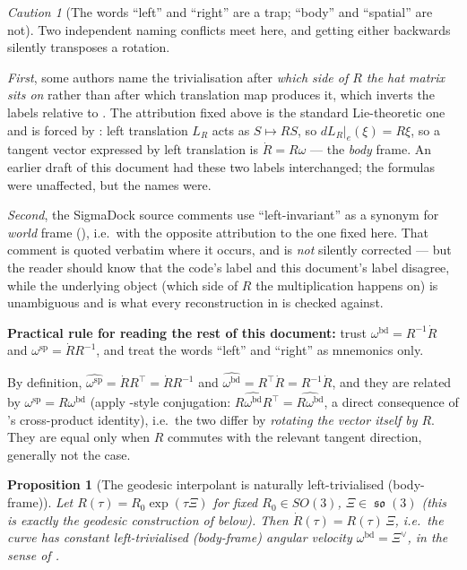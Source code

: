 \documentclass[11pt,a4paper]{report}
\newtheorem{proposition}[proposition]{Proposition}
\theoremstyle{definition}
\theoremstyle{remark}
\newtheorem{caution}[caution]{Caution}
\DeclareMathOperator{\so}{\mathfrak{so}}
\begin{document}
\begin{caution}[The words ``left'' and ``right'' are a trap; ``body'' and ``spatial'' are not]
\label{caution:trivialisation-terminology}
Two independent naming conflicts meet here, and getting either backwards
silently transposes a rotation.

\emph{First}, some authors name the trivialisation after \emph{which side of
$R$ the hat matrix sits on} rather than after which translation map produces
it, which inverts the labels relative to
. The attribution fixed above is the
standard Lie-theoretic one and is forced by
: left translation $L_R$ acts as $S\mapsto RS$, so
$dL_R|_e(\xi)=R\xi$, so a tangent vector expressed by left translation is
$\dot R = R\widehat\omega$ --- the \emph{body} frame. An earlier draft of this
document had these two labels interchanged; the formulas were unaffected, but
the names were.

\emph{Second}, the SigmaDock source comments use ``left-invariant'' as a
synonym for \emph{world} frame (), i.e.\ with the
opposite attribution to the one fixed here. That comment is quoted verbatim
where it occurs, and is \emph{not} silently corrected --- but the reader
should know that the code's label and this document's label disagree, while
the underlying object (which side of $R$ the multiplication happens on) is
unambiguous and is what every reconstruction in
 is checked against.

\textbf{Practical rule for reading the rest of this document:} trust
$\omega^{\mathrm{bd}}=R^{-1}\dot R$ and $\omega^{\mathrm{sp}}=\dot RR^{-1}$,
and treat the words ``left'' and ``right'' as mnemonics only.
\end{caution}

By definition, $\widehat{\omega^{\mathrm{sp}}}=\dot RR^\top=\dot RR^{-1}$ and
$\widehat{\omega^{\mathrm{bd}}}=R^\top\dot R=R^{-1}\dot R$, and they are
related by $\omega^{\mathrm{sp}}=R\omega^{\mathrm{bd}}$ (apply
-style conjugation: $R\widehat{\omega^{\mathrm{bd}}}R^\top=\widehat{R\omega^{\mathrm{bd}}}$,
a direct consequence of 's cross-product identity),
i.e.\ the two differ by \emph{rotating the vector itself by $R$}. They are
equal only when $R$ commutes with the relevant tangent direction, generally
not the case.

\begin{proposition}[The geodesic interpolant is naturally left-trivialised (body-frame)]
\label{prop:geodesic-body-triv}
Let $R(\tau)=R_0\exp(\tau\Xi)$ for fixed $R_0\in SO(3)$, $\Xi\in\so(3)$
(this is exactly the geodesic construction of 
below). Then $\dot R(\tau) = R(\tau)\,\Xi$, i.e.\ the curve has \emph{constant}
left-trivialised (body-frame) angular velocity $\omega^{\mathrm{bd}}=\Xi^\vee$,
in the sense of .
\end{proposition}
\end{document}

